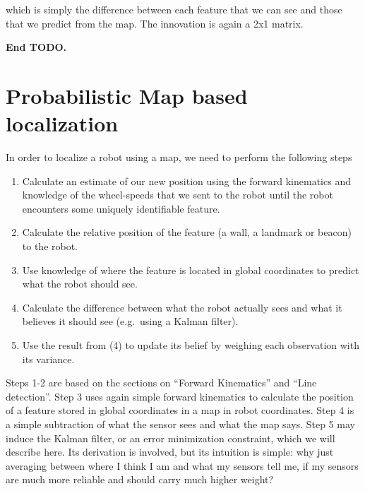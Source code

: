 which is simply the difference between each feature that we can see and those that we predict from the map. The innovation is again a 2x1 matrix.

\textbf{End TODO.}

\section{Probabilistic Map based localization}
In order to localize a robot using a map, we need to perform the following steps
\begin{enumerate}
\item Calculate an estimate of our new position using the forward kinematics and knowledge of the wheel-speeds that we sent to the robot until the robot encounters some uniquely identifiable feature.
\item Calculate the relative position of the feature (a wall, a landmark or beacon) to the robot.
\item Use knowledge of where the feature is located in global coordinates to predict what the robot should see.
\item Calculate the difference between what the robot actually sees and what it believes it should see (e.g.\ using a Kalman filter).
\item Use the result from (4) to update its belief by weighing each observation with its variance.
\end{enumerate}

Steps 1-2 are based on the sections on ``Forward Kinematics'' and ``Line detection''. Step 3 uses again simple forward kinematics to calculate the position of a feature stored in global coordinates in a map in robot coordinates. Step 4 is a simple subtraction of what the sensor sees and what the map says. Step 5 may induce the Kalman filter, or an error minimization constraint, which we will describe here. Its derivation is involved, but its intuition is simple: why just averaging between where I think I am and what my sensors tell me, if my sensors are much more reliable and should carry much higher weight?


